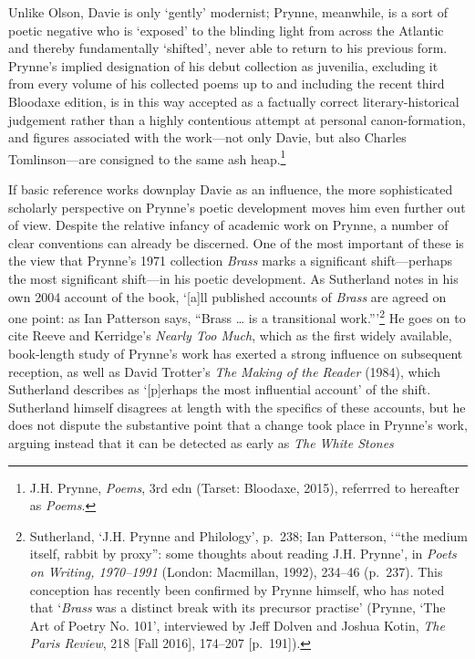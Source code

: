 \documentclass[]{article}
\begin{document}
Unlike Olson, Davie is only ‘gently’ modernist; Prynne, meanwhile, is a
sort of poetic negative who is ‘exposed’ to the blinding light from
across the Atlantic and thereby fundamentally ‘shifted’, never able to
return to his previous form. Prynne’s implied designation of his debut
collection as juvenilia, excluding it from every volume of his collected
poems up to and including the recent third Bloodaxe edition, is in this
way accepted as a factually correct literary-historical judgement rather
than a highly contentious attempt at personal canon-formation, and
figures associated with the work—not only Davie, but also Charles
Tomlinson—are consigned to the same ash heap.\footnote{J.H. Prynne,
  \emph{Poems}, 3rd edn (Tarset: Bloodaxe, 2015), referrred to hereafter
  as \emph{Poems}.}

If basic reference works downplay Davie as an influence, the more
sophisticated scholarly perspective on Prynne’s poetic development moves
him even further out of view. Despite the relative infancy of academic
work on Prynne, a number of clear conventions can already be discerned.
One of the most important of these is the view that Prynne’s 1971
collection \emph{Brass} marks a significant shift—perhaps the most
significant shift—in his poetic development. As Sutherland notes in his
own 2004 account of the book, ‘{[}a{]}ll published accounts of
\emph{Brass} are agreed on one point: as Ian Patterson says, “Brass
\ldots{} is a transitional work.”’\footnote{Sutherland, ‘J.H. Prynne and
  Philology’, p.~238; Ian Patterson, ‘“the medium itself, rabbit by
  proxy”: some thoughts about reading J.H. Prynne’, in \emph{Poets on
  Writing, 1970–1991} (London: Macmillan, 1992), 234–46 (p.~237). This
  conception has recently been confirmed by Prynne himself, who has
  noted that ‘\emph{Brass} was a distinct break with its precursor
  practise’ (Prynne, ‘The Art of Poetry No. 101’, interviewed by Jeff
  Dolven and Joshua Kotin, \emph{The Paris Review}, 218 {[}Fall 2016{]},
  174–207 {[}p.~191{]}).} He goes on to cite Reeve and Kerridge’s
\emph{Nearly Too Much}, which as the first widely available, book-length
study of Prynne’s work has exerted a strong influence on subsequent
reception, as well as David Trotter’s \emph{The Making of the Reader}
(1984), which Sutherland describes as ‘{[}p{]}erhaps the most
influential account’ of the shift. Sutherland himself disagrees at
length with the specifics of these accounts, but he does not dispute the
substantive point that a change took place in Prynne’s work, arguing
instead that it can be detected as early as \emph{The White Stones}
\end{document}
